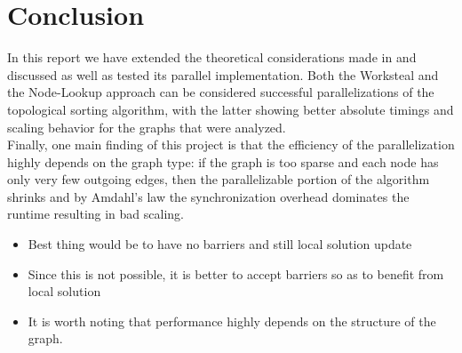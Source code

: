 \section{Conclusion}
%
In this report we have extended the theoretical considerations made in \cite{er1983parallel} and discussed as well as tested its parallel implementation.
Both the Worksteal and the Node-Lookup approach can be considered successful parallelizations of the topological sorting algorithm, with the latter showing better absolute timings and scaling behavior for the graphs that were analyzed. \\
Finally, one main finding of this project is that the efficiency of the parallelization highly depends on the graph type: if the graph is too sparse and each node has only very few outgoing edges, then the parallelizable portion of the algorithm shrinks and by Amdahl's law the synchronization overhead dominates the runtime resulting in bad scaling. \\

\begin{invisible}
 \begin{itemize}
   \item Best thing would be to have no barriers and still local solution update
   \item Since this is not possible, it is better to accept barriers so as to benefit from local solution
   \item It is worth noting that performance highly depends on the structure of the graph.
 \end{itemize}
\end{invisible}
